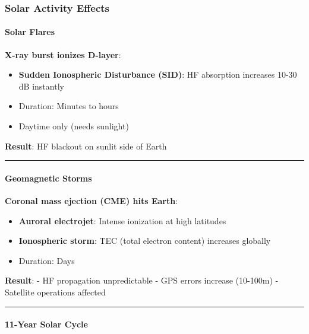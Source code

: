 \subsubsection{Solar Activity Effects}\label{solar-activity-effects}

\paragraph{Solar Flares}\label{solar-flares}

\textbf{X-ray burst ionizes D-layer}:

\begin{itemize}
\tightlist
\item
  \textbf{Sudden Ionospheric Disturbance (SID)}: HF absorption increases
  10-30 dB instantly
\item
  Duration: Minutes to hours
\item
  Daytime only (needs sunlight)
\end{itemize}

\textbf{Result}: HF blackout on sunlit side of Earth

\begin{center}\rule{0.5\linewidth}{0.5pt}\end{center}

\paragraph{Geomagnetic Storms}\label{geomagnetic-storms}

\textbf{Coronal mass ejection (CME) hits Earth}:

\begin{itemize}
\tightlist
\item
  \textbf{Auroral electrojet}: Intense ionization at high latitudes
\item
  \textbf{Ionospheric storm}: TEC (total electron content) increases
  globally
\item
  Duration: Days
\end{itemize}

\textbf{Result}: - HF propagation unpredictable - GPS errors increase
(10-100m) - Satellite operations affected

\begin{center}\rule{0.5\linewidth}{0.5pt}\end{center}

\paragraph{11-Year Solar Cycle}\label{year-solar-cycle}

